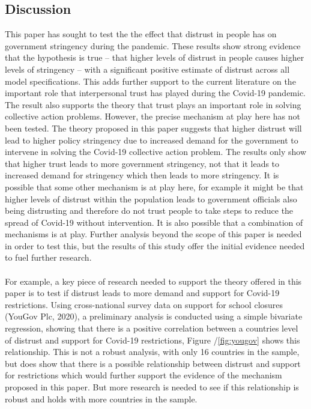 \documentclass[
  12pt,
]{article}
\begin{document}
\hypertarget{discussion}{%
\subsection{Discussion}\label{discussion}}

This paper has sought to test the the effect that distrust in people has on government stringency during the pandemic. These results show strong evidence that the hypothesis is true -- that higher levels of distrust in people causes higher levels of stringency -- with a significant positive estimate of distrust across all model specifications. This adds further support to the current literature on the important role that interpersonal trust has played during the Covid-19 pandemic. The result also supports the theory that trust plays an important role in solving collective action problems. However, the precise mechanism at play here has not been tested. The theory proposed in this paper suggests that higher distrust will lead to higher policy stringency due to increased demand for the government to intervene in solving the Covid-19 collective action problem. The results only show that higher trust leads to more government stringency, not that it leads to increased demand for stringency which then leads to more stringency. It is possible that some other mechanism is at play here, for example it might be that higher levels of distrust within the population leads to government officials also being distrusting and therefore do not trust people to take steps to reduce the spread of Covid-19 without intervention. It is also possible that a combination of mechanisms is at play. Further analysis beyond the scope of this paper is needed in order to test this, but the results of this study offer the initial evidence needed to fuel further research.\\
~\\
For example, a key piece of research needed to support the theory offered in this paper is to test if distrust leads to more demand and support for Covid-19 restrictions. Using cross-national survey data on support for school closures (YouGov Plc, 2020), a preliminary analysis is conducted using a simple bivariate regression, showing that there is a positive correlation between a countries level of distrust and support for Covid-19 restrictions, Figure /\ref{fig:yougov} shows this relationship. This is not a robust analysis, with only 16 countries in the sample, but does show that there is a possible relationship between distrust and support for restrictions which would further support the evidence of the mechanism proposed in this paper. But more research is needed to see if this relationship is robust and holds with more countries in the sample.\\
~\\
\end{document}
